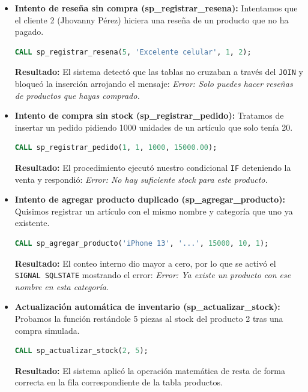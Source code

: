 \documentclass[10pt,letterpaper]{article}
\begin{document}
\begin{itemize}
    \item \textbf{Intento de rese\~na sin compra (sp\_registrar\_resena):} Intentamos que el cliente 2 (Jhovanny P\'erez) hiciera una rese\~na de un producto que no ha pagado.
\begin{lstlisting}[language=SQL, frame=single, caption={Prueba de rese\~na inv\'alida}]
CALL sp_registrar_resena(5, 'Excelente celular', 1, 2);
\end{lstlisting}
    \textbf{Resultado:} El sistema detect\'o que las tablas no cruzaban a trav\'es del \texttt{JOIN} y bloque\'o la inserci\'on arrojando el mensaje: \textit{Error: Solo puedes hacer rese\~nas de productos que hayas comprado.}

    \item \textbf{Intento de compra sin stock (sp\_registrar\_pedido):} Tratamos de insertar un pedido pidiendo 1000 unidades de un art\'iculo que solo ten\'ia 20.
\begin{lstlisting}[language=SQL, frame=single, caption={Prueba de stock insuficiente}]
CALL sp_registrar_pedido(1, 1, 1000, 15000.00);
\end{lstlisting}
    \textbf{Resultado:} El procedimiento ejecut\'o nuestro condicional \texttt{IF} deteniendo la venta y respondi\'o: \textit{Error: No hay suficiente stock para este producto.}

    \item \textbf{Intento de agregar producto duplicado (sp\_agregar\_producto):} Quisimos registrar un art\'iculo con el mismo nombre y categor\'ia que uno ya existente.
\begin{lstlisting}[language=SQL, frame=single, caption={Prueba de control de duplicados}]
CALL sp_agregar_producto('iPhone 13', '...', 15000, 10, 1);
\end{lstlisting}
    \textbf{Resultado:} El conteo interno dio mayor a cero, por lo que se activ\'o el \texttt{SIGNAL SQLSTATE} mostrando el error: \textit{Error: Ya existe un producto con ese nombre en esta categor\'ia.}

    \item \textbf{Actualizaci\'on autom\'atica de inventario (sp\_actualizar\_stock):} Probamos la funci\'on restándole 5 piezas al stock del producto 2 tras una compra simulada.
\begin{lstlisting}[language=SQL, frame=single, caption={Prueba de resta de inventario}]
CALL sp_actualizar_stock(2, 5);
\end{lstlisting}
    \textbf{Resultado:} El sistema aplic\'o la operaci\'on matem\'atica de resta de forma correcta en la fila correspondiente de la tabla productos.


\end{itemize}
\end{document}
